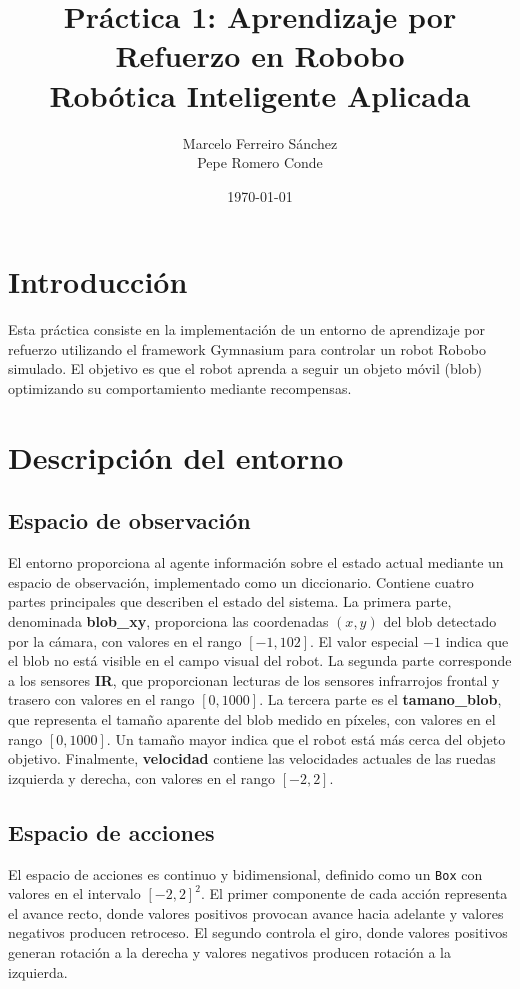 \documentclass[12pt,a4paper]{article}
\title{Práctica 1: Aprendizaje por Refuerzo en Robobo\\
\large Robótica Inteligente Aplicada}
\author{Marcelo Ferreiro Sánchez\\ Pepe Romero Conde}
\date{\today}
\begin{document}
\maketitle


\section{Introducción}

Esta práctica consiste en la implementación de un entorno de aprendizaje por
refuerzo utilizando el framework Gymnasium para controlar un robot Robobo
simulado. El objetivo es que el robot aprenda a seguir un objeto móvil (blob)
optimizando su comportamiento mediante recompensas.

\section{Descripción del entorno}

\subsection{Espacio de observación}

El entorno proporciona al agente información sobre el estado actual mediante un
espacio de observación, implementado como un diccionario. Contiene cuatro
partes principales que describen el estado del sistema. La primera
parte, denominada \textbf{blob\_xy}, proporciona las coordenadas $(x, y)$
del blob detectado por la cámara, con valores en el rango $[-1, 102]$. El valor
especial $-1$ indica que el blob no está visible en el campo visual del robot.
La segunda parte corresponde a los sensores \textbf{IR}, que proporcionan
lecturas de los sensores infrarrojos frontal y trasero con valores en el rango
$[0, 1000]$. La tercera parte es el \textbf{tamano\_blob}, que representa el
tamaño aparente del blob medido en píxeles, con valores en el rango $[0, 1000]$.
Un tamaño mayor indica que el robot está más cerca del objeto objetivo.
Finalmente, \textbf{velocidad} contiene las velocidades actuales
de las ruedas izquierda y derecha, con valores en el rango $[-2, 2]$.

\subsection{Espacio de acciones}

El espacio de acciones es continuo y bidimensional, definido como un
\texttt{Box} con valores en el intervalo $[-2, 2]^2$. El primer componente de
cada acción representa el avance recto, donde valores positivos provocan avance
hacia adelante y valores negativos producen retroceso. El segundo
controla el giro, donde valores positivos generan rotación a la derecha y
valores negativos producen rotación a la izquierda.
\end{document}
